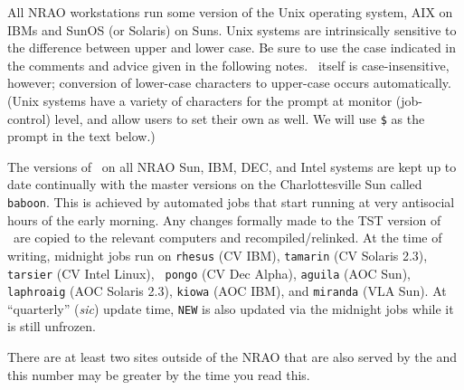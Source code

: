 
     All NRAO workstations run some version of the Unix operating
system, AIX on IBMs and SunOS (or Solaris) on Suns.  Unix systems are
intrinsically sensitive to the difference between upper and lower
case.  Be sure to use the case indicated in the comments and advice
given in the following notes.  \AIPS\ itself is case-insensitive,
however; conversion of lower-case characters to upper-case occurs
automatically.  (Unix systems have a variety of characters for the
prompt at monitor (job-control) level, and allow users to set their
own as well.  We will use {\tt \$} as the prompt in the text below.)


    The versions of \AIPS\ on all NRAO Sun, IBM, DEC, and Intel
systems are kept up to date continually with the master versions on
the Charlottesville Sun called {\tt baboon}.  This is achieved by
automated jobs that start running at very antisocial hours of the
early morning.  Any changes formally made to the {\us TST} version of
\AIPS\ are copied to the relevant computers and recompiled/relinked.
At the time of writing, midnight jobs run on {\tt rhesus} (CV IBM),
{\tt tamarin} (CV Solaris 2.3), {\tt tarsier} (CV Intel Linux), {\tt
pongo} (CV Dec Alpha), {\tt aguila} (AOC Sun), {\tt laphroaig} (AOC
Solaris 2.3), {\tt kiowa} (AOC IBM), and {\tt miranda} (VLA Sun).  At
``quarterly'' ({\it sic\/}) update time, {\tt NEW} is also updated via
the midnight jobs while it is still unfrozen.

There are at least two sites outside of the NRAO that are also served
by the  and this number may be greater by the time
you read this.

\vfill\eject
{}


